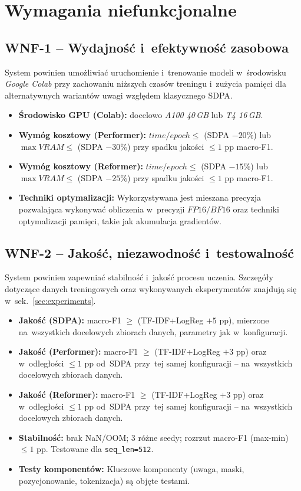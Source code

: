 \documentclass[a4paper,11pt,twoside]{report}
\theoremstyle{definition}
\begin{document}
\section{Wymagania niefunkcjonalne}\label{sec:non-functional-requirements}


\subsection{WNF-1 -- Wydajność i~efektywność zasobowa}
System powinien umożliwiać uruchomienie i~trenowanie modeli w~środowisku \textit{Google Colab} przy zachowaniu niższych czasów treningu i~zużycia pamięci dla alternatywnych wariantów uwagi względem klasycznego SDPA.
\begin{itemize}
  \item \textbf{Środowisko GPU (Colab):} docelowo \emph{A100 40\,GB} lub \emph{T4 16\,GB}. 
  \item \textbf{Wymóg kosztowy (Performer):} \(time/epoch \leq \) (SDPA $-20\%$) lub \(\max VRAM \leq \) (SDPA $-30\%$) przy spadku jakości $\leq 1$ pp macro-F1.
  \item \textbf{Wymóg kosztowy (Reformer):} \(time/epoch \leq \) (SDPA $-15\%$) lub \(\max VRAM \leq \) (SDPA $-25\%$) przy spadku jakości $\leq 1$ pp macro-F1.
  \item \textbf{Techniki optymalizacji:} Wykorzystywana jest mieszana precyzja pozwalająca wykonywać obliczenia w~precyzji $FP16/BF16$ oraz techniki optymalizacji pamięci, takie jak akumulacja gradientów.
\end{itemize}

\subsection{WNF-2 -- Jakość, niezawodność i~testowalność}
System powinien zapewniać stabilność i~jakość procesu uczenia. Szczegóły dotyczące danych treningowych oraz wykonywanych eksperymentów znajdują się w~sek.~\ref{sec:experiments}.
\begin{itemize}
  \item \textbf{Jakość (SDPA):} macro-F1 \(\geq\) (TF-IDF+LogReg $+5$ pp), mierzone na~wszystkich docelowych zbiorach danych, parametry jak w~konfiguracji.
  \item \textbf{Jakość (Performer):} macro-F1 \(\geq\) (TF-IDF+LogReg $+3$ pp) oraz w~odległości \(\leq 1\) pp od~SDPA przy~tej samej konfiguracji -- na~wszystkich docelowych zbiorach danych.
  \item \textbf{Jakość (Reformer):} macro-F1 \(\geq\) (TF-IDF+LogReg $+3$ pp) oraz w~odległości \(\leq 1\) pp od~SDPA przy~tej samej konfiguracji -- na~wszystkich docelowych zbiorach danych.
  \item \textbf{Stabilność:} brak NaN/OOM; 3 różne seedy; rozrzut macro-F1 (max-min) \(\leq 1\) pp. Testowane dla \texttt{seq\_len=512}.
  \item \textbf{Testy komponentów:} Kluczowe komponenty (uwaga, maski, pozycjonowanie, tokenizacja) są objęte testami.
\end{itemize}
\end{document}
